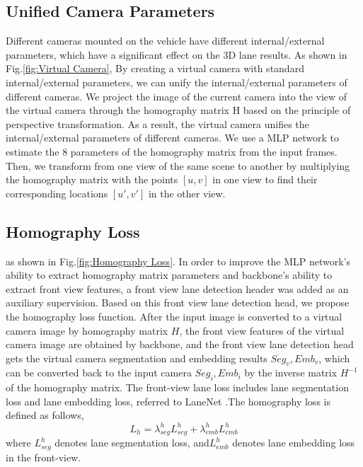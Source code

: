 \subsection{Unified Camera Parameters}
\label{subsec:Unified Camera Parameters}
Different cameras mounted on the vehicle have different internal/external parameters,
which have a significant effect on the 3D lane results.
As shown in Fig.\ref{fig:Virtual Camera},
By creating a virtual camera with standard internal/external parameters,
we can unify the internal/external parameters of different cameras.
We project the image of the current camera into the view of the virtual camera through the homography matrix H based on the principle of perspective transformation.
As a result, the virtual camera unifies the internal/external parameters of different cameras.
We use a MLP network to estimate the 8 parameters of the homography matrix from the input frames.
Then, we transform from one view of the same scene to another by multiplying the homography matrix with the points $[u,v]$ in one view
to find their corresponding locations $[u',v']$ in the other view.

\subsection{Homography Loss}
\label{subsec:Homography Loss}
as shown in Fig.\ref{fig:Homography Loss}. In order to improve the MLP network's ability to extract homography matrix parameters and backbone's ability to extract front view features,
a front view lane detection header was added as an auxiliary supervision.
Based on this front view lane detection head, we propose the homography loss function.
After the input image is converted to a virtual camera image by homography matrix $H$,
the front view features of the virtual camera image are obtained by backbone,
and the front view lane detection head gets the virtual camera segmentation and embedding results ${Seg}_{v}, {Emb}_{v}$,
which can be converted back to the input camera ${Seg}_{i}, {Emb}_{i}$ by the inverse matrix $H^{-1}$ of the homography matrix.
The front-view lane loss includes lane segmentation loss and lane embedding loss, referred to LaneNet \cite{neven2018towards}.The homography loss is defined as follows,
\[
L_{h}=\lambda_{seg}^h L_{seg}^h + \lambda_{emb}^h L_{emb}^h
\]
where $L_{seg}^h$ denotes lane segmentation loss, and$L_{emb}^h$ denotes lane embedding loss in the front-view.
